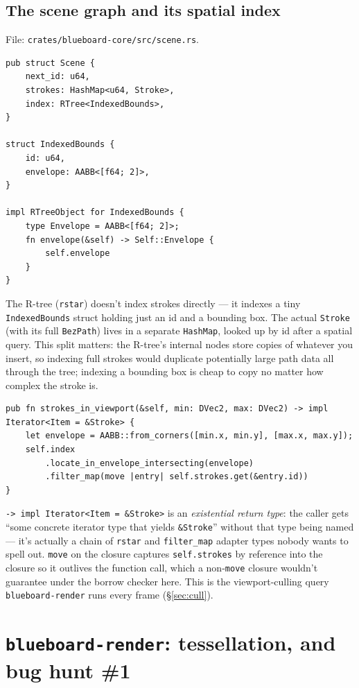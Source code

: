 \documentclass[11pt]{article}
\begin{document}
\subsection{The scene graph and its spatial index}
File: \texttt{crates/blueboard-core/src/scene.rs}.
\begin{lstlisting}
pub struct Scene {
    next_id: u64,
    strokes: HashMap<u64, Stroke>,
    index: RTree<IndexedBounds>,
}

struct IndexedBounds {
    id: u64,
    envelope: AABB<[f64; 2]>,
}

impl RTreeObject for IndexedBounds {
    type Envelope = AABB<[f64; 2]>;
    fn envelope(&self) -> Self::Envelope {
        self.envelope
    }
}
\end{lstlisting}
The R-tree (\texttt{rstar}) doesn't index strokes directly — it indexes a tiny
\texttt{IndexedBounds} struct holding just an id and a bounding box. The actual
\texttt{Stroke} (with its full \texttt{BezPath}) lives in a separate \texttt{HashMap},
looked up by id after a spatial query. This split matters: the R-tree's internal nodes
store copies of whatever you insert, so indexing full strokes would duplicate potentially
large path data all through the tree; indexing a bounding box is cheap to copy no matter
how complex the stroke is.
\begin{lstlisting}
pub fn strokes_in_viewport(&self, min: DVec2, max: DVec2) -> impl Iterator<Item = &Stroke> {
    let envelope = AABB::from_corners([min.x, min.y], [max.x, max.y]);
    self.index
        .locate_in_envelope_intersecting(envelope)
        .filter_map(move |entry| self.strokes.get(&entry.id))
}
\end{lstlisting}
\texttt{-> impl Iterator<Item = \&Stroke>} is an \emph{existential return type}: the
caller gets ``some concrete iterator type that yields \texttt{\&Stroke}'' without that
type being named — it's actually a chain of \texttt{rstar} and \texttt{filter\_map}
adapter types nobody wants to spell out. \texttt{move} on the closure captures
\texttt{self.strokes} by reference into the closure so it outlives the function call,
which a non-\texttt{move} closure wouldn't guarantee under the borrow checker here. This
is the viewport-culling query \texttt{blueboard-render} runs every frame (\S\ref{sec:cull}).

\section{\texttt{blueboard-render}: tessellation, and bug hunt \#1}
\end{document}
